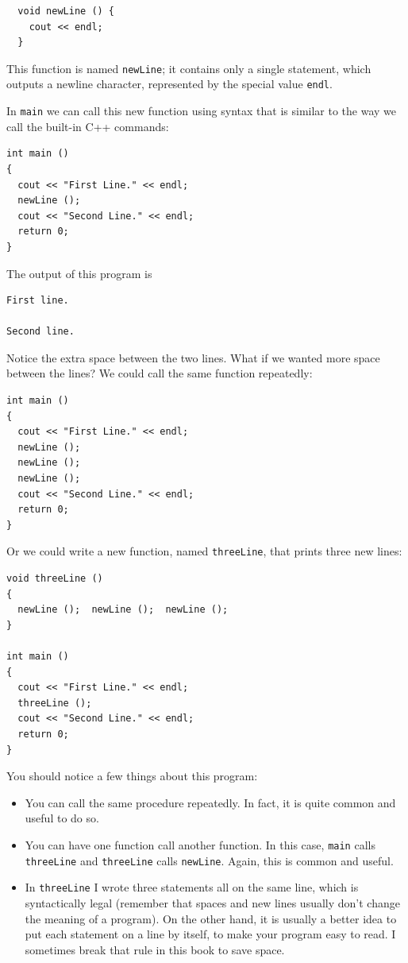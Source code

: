 \begin{verbatim}
  void newLine () {
    cout << endl;
  }
\end{verbatim}
%
This function is named {\tt newLine}; it contains only a single
statement, which outputs a newline character, represented by
the special value {\tt endl}.

In {\tt main} we can call this new function using syntax that
is similar to the way we call the built-in C++ commands:

\begin{verbatim}
int main ()
{
  cout << "First Line." << endl;
  newLine ();
  cout << "Second Line." << endl;
  return 0;
}
\end{verbatim}
%
The output of this program is

\begin{verbatim}
First line.

Second line.
\end{verbatim}
%
Notice the extra space between the two lines.  What if we wanted
more space between the lines?  We could call the same
function repeatedly:

\begin{verbatim}
int main ()
{
  cout << "First Line." << endl;
  newLine ();
  newLine ();
  newLine ();
  cout << "Second Line." << endl;
  return 0;
}
\end{verbatim}
%
Or we could write a new function, named {\tt threeLine}, that 
prints three new lines:

\begin{verbatim}
void threeLine ()
{
  newLine ();  newLine ();  newLine ();
}

int main ()
{
  cout << "First Line." << endl;
  threeLine ();
  cout << "Second Line." << endl;
  return 0;
}
\end{verbatim}
%
You should notice a few things about this program:

\begin{itemize}

\item You can call the same procedure repeatedly.  In
fact, it is quite common and useful to do so.

\item You can have one function call another function.  In this
case, {\tt main} calls {\tt threeLine} and {\tt threeLine}
calls {\tt newLine}.  Again, this is common and useful.

\item In {\tt threeLine} I wrote three statements all on the
same line, which is syntactically legal (remember that spaces
and new lines usually don't change the meaning of a program).
On the other hand, it is usually a better idea to put each
statement on a line by itself, to make your program easy to
read.  I sometimes break that rule in this book to save space.

\end{itemize}

